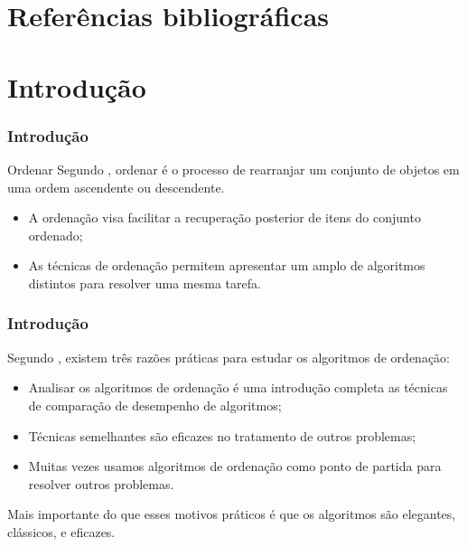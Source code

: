 \documentclass[aspectratio=169]{beamer}
\begin{document}
\section{Referências bibliográficas}


\section{Introdução} %

\begin{frame}
\frametitle{Introdução}
\begin{block}{Ordenar}
 Segundo , ordenar é o processo de rearranjar um conjunto de objetos em uma ordem ascendente ou descendente.
\end{block}
\begin{itemize}
\item A ordenação visa facilitar a recuperação posterior de itens do conjunto ordenado;
\item As técnicas de ordenação permitem apresentar um amplo de algoritmos distintos para resolver uma mesma tarefa.
\end{itemize}
\end{frame}


\begin{frame}
\frametitle{Introdução}
 Segundo , existem três razões práticas para estudar os algoritmos de ordenação:
\begin{itemize}
\item Analisar os algoritmos de ordenação é uma introdução completa as técnicas de comparação de desempenho de algoritmos;
\item Técnicas semelhantes são eficazes no tratamento de outros problemas;
\item Muitas vezes usamos algoritmos de ordenação como ponto de partida para resolver outros problemas.
\end{itemize}
\pause
Mais importante do que esses motivos práticos é que os algoritmos são elegantes, clássicos, e eficazes.
\end{frame}
\end{document}
